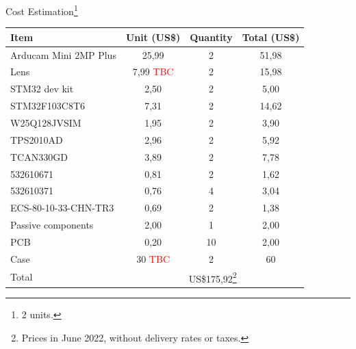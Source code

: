 \begin{frame}{Cost Estimation\footnote{2 units.}}

\begin{table}[!htb]\scriptsize
    \centering
    \label{tab:cost-estimation}
    \begin{tabular}{lccc}
        \toprule[1.5pt]
        \textbf{Item} & \textbf{Unit (US\$)} & \textbf{Quantity} & \textbf{Total (US\$)} \\
        \midrule
        Arducam Mini 2MP Plus & 25,99 & 2  & 51,98 \\
        Lens                  & 7,99 \textcolor{red}{TBC} & 2  & 15,98 \\
        STM32 dev kit         & 2,50  & 2  & 5,00 \\
        STM32F103C8T6         & 7,31  & 2  & 14,62 \\
        W25Q128JVSIM          & 1,95  & 2  & 3,90 \\
        TPS2010AD             & 2,96  & 2  & 5,92 \\
        TCAN330GD             & 3,89  & 2  & 7,78 \\
        532610671             & 0,81  & 2  & 1,62 \\
        532610371             & 0,76  & 4  & 3,04 \\
        ECS-80-10-33-CHN-TR3  & 0,69  & 2  & 1,38 \\
        Passive components    & 2,00  & 1  & 2,00 \\
        PCB                   & 0,20  & 10 & 2,00 \\
        Case                  & 30 \textcolor{red}{TBC} & 2  & 60 \\
        \midrule
        Total          & \multicolumn{3}{c}{US\$175,92\footnote{Prices in June 2022, without delivery rates or taxes.}} \\
        \bottomrule[1.5pt]
    \end{tabular}
\end{table}

\end{frame}